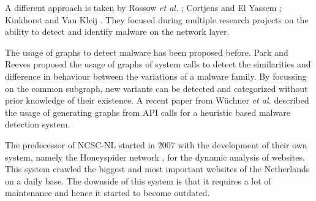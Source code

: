 A different approach is taken by Rossow \textit{et al.} \cite{Rossow2011}; Cortjens and El Yassem \cite{Cortjens2012}; Kinkhorst and Van Kleij \cite{Kinkhorst2009}. They focused during multiple research projects on the ability to detect and identify malware on the network layer.

The usage of graphs to detect malware has been proposed before. Park and Reeves proposed\cite{Park2011} the usage of graphs of system calls to detect the similarities and difference in behaviour between the variations of a malware family. By focussing on the common subgraph, new variants can be detected and categorized without prior knowledge of their existence. A recent paper\cite{Wuchner2014} from W\"{u}chner \textit{et al.} described the usage of generating graphs from API calls for a heuristic based malware detection system.

The predecessor of NCSC-NL started in 2007 with the development of their own system, namely the Honeyspider network \cite{honeyspider}, for the dynamic analysis of websites. This system crawled the biggest and most important websites of the Netherlands on a daily base. The downside of this system is that it requires a lot of maintenance and hence it started to become outdated.

\iffalse
\subsection{Scope}

\todo{Zelfstandiger maken}

In this research project is an an algorithm created that allows multiple URLs to be opened at the same time while still being able to track all further interaction, such as unexpected HTTP requests and other malicious activity, and link them to the original request/URL. To prove that the algorithm is something feasible, a proof of concept of the algorithm has been implemented on top of the Cuckoo Sandbox.

The goal during this research project was to make the algorithm fully platform agnostic, however, several technical challenges prevented this. For this reason we limited our self to Windows 7 with version 8 of the Internet Explorer browser and have we the identified issues described.

The detection and identification of malicious behaviour was not part of this project. For our PoC we sticked to the detection of a well-known older and still to be determined malware family which existence is easy to detect on the system. 

\subsection{Ethical issues}

Our research contains no major ethical issues as it does not include working with personally identifiable information. Malware, if any, will be run in a controlled virtual environment. After every testrun the virtual machine will be automatically destroyed.

\fi
